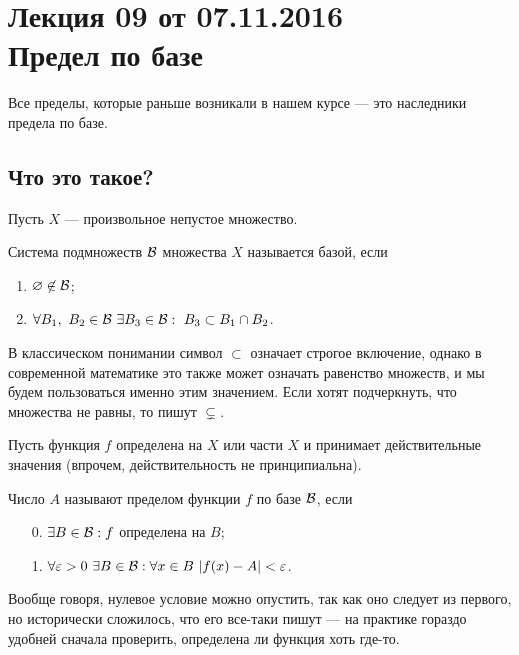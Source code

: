 \documentclass[a4paper, 12pt]{article}
\begin{document}
\pagestyle{fancy}
\section{Лекция 09 от 07.11.2016 \\ Предел по базе}
Все пределы, которые раньше возникали в нашем курсе --- это наследники предела по базе.

\subsection{Что это такое?}

Пусть $X$ --- произвольное непустое множество.

\begin{Def}
Система подмножеств $\mathcal{B}$ множества $X$ называется базой, если
\begin{enumerate}
\item $\varnothing \not\in \mathcal{B}$;
\item $\forall B_1,\ B_2 \in \mathcal{B}\ \exists B_3 \in \mathcal{B} :\ B_3 \subset B_1 \cap B_2$.
\end{enumerate}
\end{Def}

\begin{Comment}
В классическом понимании символ $\subset$ означает строгое включение, однако в современной математике это также может означать равенство множеств, и мы будем пользоваться именно этим значением. Если хотят подчеркнуть, что множества не равны, то пишут $\varsubsetneq$.
\end{Comment}

Пусть функция $f$ определена на $X$ или части $X$ и принимает действительные значения
(впрочем, действительность не принципиальна).
\begin{Def}
Число $A$ называют пределом функции $f$ по базе $\mathcal{B}$, если
\begin{itemize}
\item[0.] $\exists B \in \mathcal{B}: f$ определена на $B$;
\item[1.] $\forall \varepsilon > 0\ \exists B \in \mathcal{B}: \forall x \in B\ |f(x) - A| < \varepsilon$.
\end{itemize}
\end{Def}
Вообще говоря, нулевое условие можно опустить, так как оно следует из первого, но исторически сложилось, что его все-таки пишут --- на практике гораздо удобней сначала проверить, определена ли функция хоть где-то.
\end{document}
